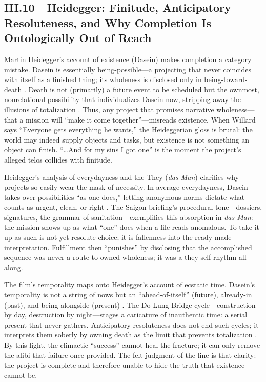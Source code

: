 \subsection*{III.10—Heidegger: Finitude, Anticipatory Resoluteness, and Why Completion Is
	Ontologically Out of Reach}
\label{ssec:iii-heidegger}
Martin Heidegger's account of existence (Dasein) makes completion a category mistake. Dasein is
essentially being-possible—a projecting that never coincides with itself as a finished thing;
its wholeness is disclosed only in being-toward-death \parencite[pp.~279--311]{HeideggerBT1962}.
Death is not (primarily) a future event to be scheduled but the ownmost, nonrelational
possibility that individualizes Dasein now, stripping away the illusions of totalization
\parencite[pp.~294--307]{HeideggerBT1962}. Thus, any project that promises narrative wholeness—that
a mission will ``make it come together''—misreads existence. When Willard says ``Everyone gets
everything he wants,'' the Heideggerian gloss is brutal: the world may indeed supply objects and
tasks, but existence is not something an object can finish. ``\ldots And for my sins I got one''
is the moment the project's alleged telos collides with finitude.

Heidegger's analysis of everydayness and the They (\emph{das Man}) clarifies why projects so
easily wear the mask of necessity. In average everydayness, Dasein takes over possibilities ``as
one does,'' letting anonymous norms dictate what counts as urgent, clean, or right
\parencite[pp.~149--168]{HeideggerBT1962}. The Saigon briefing's procedural tone—dossiers,
signatures, the grammar of sanitation—exemplifies this absorption in \emph{das Man}: the mission
shows up as what ``one'' does when a file reads anomalous. To take it up as such is not yet
resolute choice; it is fallenness into the ready-made interpretation. Fulfillment then
``punishes'' by disclosing that the accomplished sequence was never a route to owned wholeness;
it was a they-self rhythm all along.

The film's temporality maps onto Heidegger's account of ecstatic time. Dasein's temporality is
not a string of nows but an ``ahead-of-itself'' (future), already-in (past), and being-alongside
(present) \parencite[pp.~373--383]{HeideggerBT1962}. The Do Lung Bridge cycle—construction by
day, destruction by night—stages a caricature of inauthentic time: a serial present that never
gathers. Anticipatory resoluteness does not end such cycles; it interprets them soberly by
owning death as the limit that prevents totalization \parencite[pp.~307--311]{HeideggerBT1962}.
By this light, the climactic ``success'' cannot heal the fracture; it can only remove the alibi
that failure once provided. The felt judgment of the line is that clarity: the project is
complete and therefore unable to hide the truth that existence cannot be.

